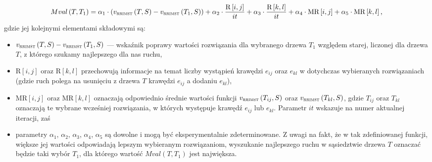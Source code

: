\begin{equation}\label{eq:moveValue}
	Mval \left( T, T_{1} \right) = \alpha_{1} \cdot \left( v_{\textsc{rrimst}} \left( T, S \right) - v_{\textsc{rrimst}} \left( T_{1}, S \right) \right) + \alpha_{2} \cdot \frac{\text{R} \left[ i, j \right]}{it} + \alpha_{3} \cdot \frac{\text{R} \left[ k, l \right]}{it} + \alpha_{4} \cdot \text{MR} \left[ i, j \right] + \alpha_{5} \cdot \text{MR} \left[ k, l \right]\text{,}
\end{equation}
gdzie jej kolejnymi elementami składowymi są:
\begin{itemize}
	\item $v_{\textsc{rrimst}} \left( T, S \right) - v_{\textsc{rrimst}} \left( T_{1}, S \right)$ --- wskaźnik poprawy wartości rozwiązania dla wybranego drzewa $T_{1}$ względem starej, liczonej dla drzewa $T$, z którego szukamy najlepszego dla nas ruchu,
	\item $\text{R} \left[ i, j \right]$ oraz $\text{R} \left[ k, l \right]$ przechowują informacje na temat liczby wystąpień krawędzi $e_{ij}$ oraz $e_{kl}$ w dotychczas wybieranych rozwiązaniach (gdzie ruch polega na usunięciu z drzewa $T$ krawędzi $e_{ij}$ a dodaniu $e_{kl}$),
	\item $\text{MR} \left[ i, j \right]$ oraz $\text{MR} \left[ k, l \right]$ oznaczają odpowiednio średnie wartości funkcji $v_{\textsc{rrimst}} \left( T_{ij}, S \right)$ oraz $v_{\textsc{rrimst}} \left( T_{kl}, S \right)$, gdzie $T_{ij}$ oraz $T_{kl}$ oznaczają te wybrane wcześniej rozwiązania, w których występuje krawędź $e_{ij}$ lub $e_{kl}$. Parametr $it$ wskazuje na numer aktualnej iteracji, zaś
	\item parametry $\alpha_{1}$, $\alpha_{2}$, $\alpha_{3}$, $\alpha_{4}$, $\alpha_{5}$ są dowolne i mogą być eksperymentalnie zdeterminowane. Z uwagi na fakt, że w tak zdefiniowanej funkcji, większe jej wartości odpowiadają lepszym wybieranym rozwiązaniom, wyszukanie najlepszego ruchu w sąsiedztwie drzewa $T$ oznaczać będzie taki wybór $T_{1}$, dla którego wartość $Mval  \left( T, T_{1} \right)$ jest największa.
\end{itemize}

